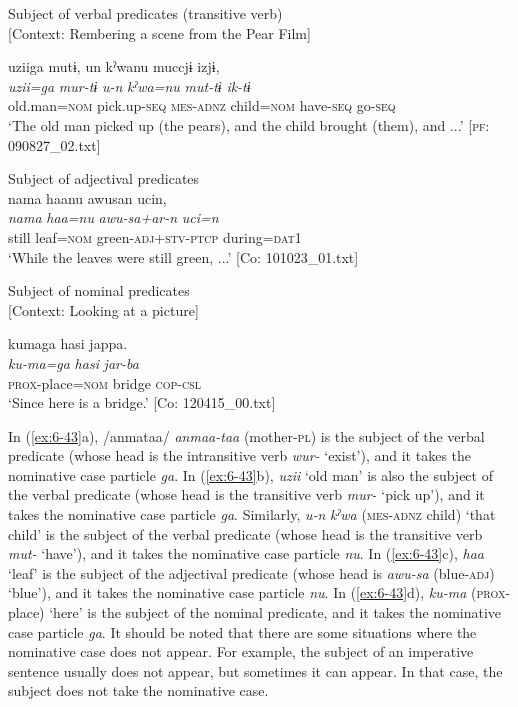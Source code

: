 \ex Subject of verbal predicates (transitive verb)\\{}
[Context: Rembering a scene from the Pear Film]

{\TM}
\glll uziiga  mutɨ,  un  kˀwanu  muccjɨ  izjɨ,\\
      \textit{uzii=ga}  \textit{mur-tɨ}  \textit{u-n}  \textit{kˀwa=nu}     \textit{mut-tɨ}  \textit{ik-tɨ}\\
      old.man=\textsc{nom}  pick.up-\textsc{seq}  \textsc{mes}-\textsc{adnz}  child=\textsc{nom} have-\textsc{seq}  go-\textsc{seq}\\
\glt ‘The old man picked up (the pears), and the child brought (them), and ...’ [\textsc{pf}: 090827\_02.txt]

\ex Subject of adjectival predicates\\
{\TM}
\glll  nama  haanu  awusan  ucin,\\
\textit{nama}  \textit{haa=nu}  \textit{awu-sa+ar-n}  \textit{uci=n}\\
still  leaf=\textsc{nom}  green-\textsc{adj}+\textsc{stv}-\textsc{ptcp}  during=\textsc{dat}1\\
\glt ‘While the leaves were still green, ...’ [Co: 101023\_01.txt]

\ex Subject of nominal predicates\\{}
[Context: Looking at a picture]

{\TM}
\glll kumaga  hasi  jappa.\\
      \textit{ku-ma=ga}  \textit{hasi}  \textit{jar-ba}\\
      \textsc{prox}-place=\textsc{nom}  bridge  \textsc{cop}-\textsc{csl}\\
\glt ‘Since here is a bridge.’ [Co: 120415\_00.txt]
\z
\z

In (\ref{ex:6-43}a), /anmataa/ \textit{anmaa-taa} (mother-\textsc{pl}) is the subject of the verbal predicate (whose head is the intransitive verb \textit{wur-} ‘exist’), and it takes the nominative case particle \textit{ga}. In (\ref{ex:6-43}b), \textit{uzii} ‘old man’ is also the subject of the verbal predicate (whose head is the transitive verb \textit{mur-} ‘pick up’), and it takes the nominative case particle \textit{ga}. Similarly, \textit{u-n} \textit{kˀwa} (\textsc{mes}-\textsc{adnz} child) ‘that child’ is the subject of the verbal predicate (whose head is the transitive verb \textit{mut-} ‘have’), and it takes the nominative case particle \textit{nu}. In (\ref{ex:6-43}c), \textit{haa} ‘leaf’ is the subject of the adjectival predicate (whose head is \textit{awu-sa} (blue-\textsc{adj}) ‘blue’), and it takes the nominative case particle \textit{nu}. In (\ref{ex:6-43}d), \textit{ku-ma} (\textsc{prox}-place) ‘here’ is the subject of the nominal predicate, and it takes the nominative case particle \textit{ga}. It should be noted that there are some situations where the nominative case does not appear. For example, the subject of an imperative sentence usually does not appear, but sometimes it can appear. In that case, the subject does not take the nominative case.


